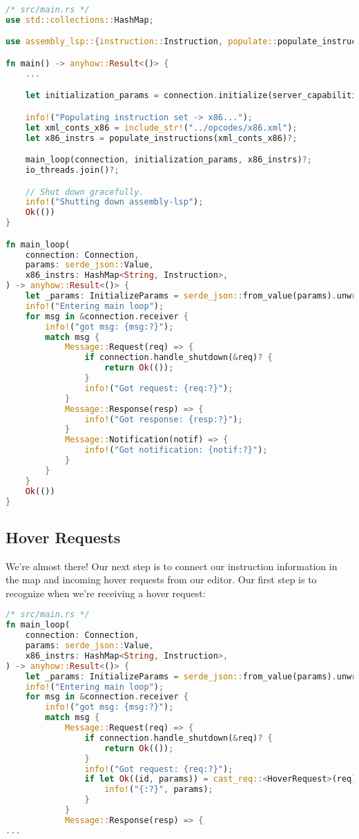 \begin{lstlisting}[language=rust]
/* src/main.rs */
use std::collections::HashMap;

use assembly_lsp::{instruction::Instruction, populate::populate_instructions};

fn main() -> anyhow::Result<()> {
    ...

    let initialization_params = connection.initialize(server_capabilities)?;

    info!("Populating instruction set -> x86...");
    let xml_conts_x86 = include_str!("../opcodes/x86.xml");
    let x86_instrs = populate_instructions(xml_conts_x86)?;

    main_loop(connection, initialization_params, x86_instrs)?;
    io_threads.join()?;

    // Shut down gracefully.
    info!("Shutting down assembly-lsp");
    Ok(())
}

fn main_loop(
    connection: Connection,
    params: serde_json::Value,
    x86_instrs: HashMap<String, Instruction>,
) -> anyhow::Result<()> {
    let _params: InitializeParams = serde_json::from_value(params).unwrap();
    info!("Entering main loop");
    for msg in &connection.receiver {
        info!("got msg: {msg:?}");
        match msg {
            Message::Request(req) => {
                if connection.handle_shutdown(&req)? {
                    return Ok(());
                }
                info!("Got request: {req:?}");
            }
            Message::Response(resp) => {
                info!("Got response: {resp:?}");
            }
            Message::Notification(notif) => {
                info!("Got notification: {notif:?}");
            }
        }
    }
    Ok(())
}
\end{lstlisting}

\subsection{Hover Requests}

We're almost there! Our next step is to connect our instruction information in the map and incoming hover requests from our editor. Our first step is to recognize when we're receiving a hover request:

\begin{lstlisting}[language=rust]
/* src/main.rs */
fn main_loop(
    connection: Connection,
    params: serde_json::Value,
    x86_instrs: HashMap<String, Instruction>,
) -> anyhow::Result<()> {
    let _params: InitializeParams = serde_json::from_value(params).unwrap();
    info!("Entering main loop");
    for msg in &connection.receiver {
        info!("got msg: {msg:?}");
        match msg {
            Message::Request(req) => {
                if connection.handle_shutdown(&req)? {
                    return Ok(());
                }
                info!("Got request: {req:?}");
                if let Ok((id, params)) = cast_req::<HoverRequest>(req) {
                    info!("{:?}", params);
                }
            }
            Message::Response(resp) => {
...
\end{lstlisting}

